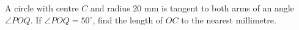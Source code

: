 A circle with centre $C$ and radius $20$ mm is tangent to both arms of an angle $\angle POQ$. If $\angle POQ=50^\circ$, find the length of $OC$ to the nearest millimetre.
